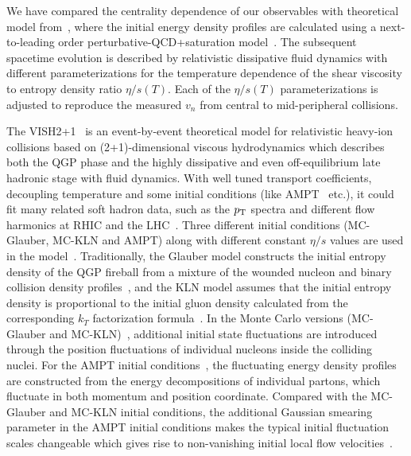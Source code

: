 We have compared the centrality dependence of our observables with theoretical model from~\cite{Niemi:2015qia}, where the initial energy density profiles are calculated using a next-to-leading order perturbative-QCD+saturation model~\cite{Paatelainen:2012at,Paatelainen:2013eea}. The subsequent spacetime evolution is described by relativistic dissipative fluid dynamics with different parameterizations for the temperature dependence of the shear viscosity to entropy density ratio $\eta/s(T)$. Each of the $\eta/s(T)$ parameterizations is adjusted to reproduce the measured $v_n$ from central to mid-peripheral collisions. 

The VISH2+1~\cite{Shen:2010uy,Shen:2014vra} is an event-by-event theoretical model for relativistic heavy-ion collisions based on (2+1)-dimensional viscous hydrodynamics which describes both the QGP phase and the highly dissipative and even off-equilibrium late hadronic stage with fluid dynamics. With well tuned transport coefficients, decoupling temperature  and some initial conditions (like {AMPT}~\cite{Xu:2016hmp,Bhalerao:2015iya,Pang:2012he} etc.), it could fit many related soft hadron data, such as the $p_{\rm T}$ spectra and different flow harmonics at RHIC and the LHC~\cite{Qiu:2011hf, Shen:2010uy, Shen:2011eg, Bhalerao:2015iya}.
Three different initial conditions ({MC-Glauber}, {MC-KLN} and {AMPT}) along with different constant $\eta/s$ values are used in the model~\cite{Zhu:2016puf}. 
Traditionally, the Glauber model constructs the initial entropy density of the QGP fireball from a mixture of the wounded nucleon and binary collision density profiles~\cite{Kolb:2000sd}, and the {KLN} model assumes that the initial entropy density is proportional to the initial gluon density calculated from the corresponding $k_T$ factorization formula~\cite{Kharzeev:2000ph}. In the Monte Carlo versions ({MC-Glauber} and {MC-KLN})~\cite{Miller:2007ri,Drescher:2006ca,Hirano:2009ah}, additional initial state fluctuations are introduced through the position fluctuations of individual nucleons inside the colliding nuclei. For the {AMPT} initial conditions~\cite{Bhalerao:2015iya,Pang:2012he,Xu:2016hmp}, the fluctuating energy density profiles are constructed from the energy decompositions of individual partons, which fluctuate in both momentum and position coordinate. Compared with the {MC-Glauber} and {MC-KLN} initial conditions, the additional Gaussian smearing parameter in the {AMPT} initial conditions makes the typical initial fluctuation scales changeable which gives rise to non-vanishing initial local flow velocities~\cite{Pang:2012he}.

